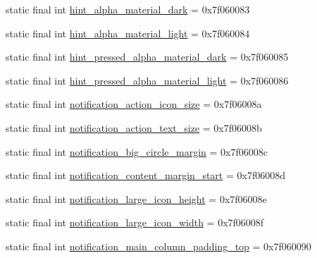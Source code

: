 \begin{DoxyCompactItemize}
\item 
static final int \mbox{\hyperlink{classandroid_1_1support_1_1v7_1_1appcompat_1_1R_1_1dimen_a5efc01f623b7f9ebe49eb5d465af1fea}{hint\+\_\+alpha\+\_\+material\+\_\+dark}} = 0x7f060083
\item 
static final int \mbox{\hyperlink{classandroid_1_1support_1_1v7_1_1appcompat_1_1R_1_1dimen_acb5326fcfa564801a635a71e58879dce}{hint\+\_\+alpha\+\_\+material\+\_\+light}} = 0x7f060084
\item 
static final int \mbox{\hyperlink{classandroid_1_1support_1_1v7_1_1appcompat_1_1R_1_1dimen_aebb62a73f9575168ba99a010d1013dfb}{hint\+\_\+pressed\+\_\+alpha\+\_\+material\+\_\+dark}} = 0x7f060085
\item 
static final int \mbox{\hyperlink{classandroid_1_1support_1_1v7_1_1appcompat_1_1R_1_1dimen_a9ff0848bc63374bd8e7268ceb5da26e8}{hint\+\_\+pressed\+\_\+alpha\+\_\+material\+\_\+light}} = 0x7f060086
\item 
static final int \mbox{\hyperlink{classandroid_1_1support_1_1v7_1_1appcompat_1_1R_1_1dimen_ab3a1cc72fd13c55f21d979bab9e143ef}{notification\+\_\+action\+\_\+icon\+\_\+size}} = 0x7f06008a
\item 
static final int \mbox{\hyperlink{classandroid_1_1support_1_1v7_1_1appcompat_1_1R_1_1dimen_a1f92dd3602ccc49f68c057a19947c745}{notification\+\_\+action\+\_\+text\+\_\+size}} = 0x7f06008b
\item 
static final int \mbox{\hyperlink{classandroid_1_1support_1_1v7_1_1appcompat_1_1R_1_1dimen_a0185f47f2f7ac8721ec928453dbdaeb6}{notification\+\_\+big\+\_\+circle\+\_\+margin}} = 0x7f06008c
\item 
static final int \mbox{\hyperlink{classandroid_1_1support_1_1v7_1_1appcompat_1_1R_1_1dimen_abf52c017674e3f95367b18e5f4fbd361}{notification\+\_\+content\+\_\+margin\+\_\+start}} = 0x7f06008d
\item 
static final int \mbox{\hyperlink{classandroid_1_1support_1_1v7_1_1appcompat_1_1R_1_1dimen_a2319b159ed59b8c5f1abd6eff006013a}{notification\+\_\+large\+\_\+icon\+\_\+height}} = 0x7f06008e
\item 
static final int \mbox{\hyperlink{classandroid_1_1support_1_1v7_1_1appcompat_1_1R_1_1dimen_af2b2c0883067d2ce7b558856794f1d29}{notification\+\_\+large\+\_\+icon\+\_\+width}} = 0x7f06008f
\item 
static final int \mbox{\hyperlink{classandroid_1_1support_1_1v7_1_1appcompat_1_1R_1_1dimen_af54bcd28e3b9be237137caadc803e650}{notification\+\_\+main\+\_\+column\+\_\+padding\+\_\+top}} = 0x7f060090
\item 

\end{DoxyCompactItemize}
